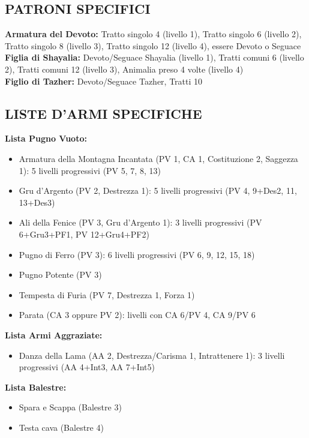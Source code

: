 \begin{multicols}{2}
	\subsection{PATRONI SPECIFICI}

	\textbf{Armatura del Devoto:} Tratto singolo 4 (livello 1), Tratto singolo 6 (livello 2), Tratto singolo 8 (livello 3), Tratto singolo 12 (livello 4), essere Devoto o Seguace\\

	\textbf{Figlia di Shayalia:} Devoto/Seguace Shayalia (livello 1), Tratti comuni 6 (livello 2), Tratti comuni 12 (livello 3), Animalia preso 4 volte (livello 4)\\

	\textbf{Figlio di Tazher:} Devoto/Seguace Tazher, Tratti 10\\

	\subsection{LISTE D'ARMI SPECIFICHE}

	\textbf{Lista Pugno Vuoto:}
	\begin{itemize}
		\item Armatura della Montagna Incantata (PV 1, CA 1, Costituzione 2, Saggezza 1): 5 livelli progressivi (PV 5, 7, 8, 13)
		\item Gru d'Argento (PV 2, Destrezza 1): 5 livelli progressivi (PV 4, 9+Des2, 11, 13+Des3)
		\item Ali della Fenice (PV 3, Gru d'Argento 1): 3 livelli progressivi (PV 6+Gru3+PF1, PV 12+Gru4+PF2)
		\item Pugno di Ferro (PV 3): 6 livelli progressivi (PV 6, 9, 12, 15, 18)
		\item Pugno Potente (PV 3)
		\item Tempesta di Furia (PV 7, Destrezza 1, Forza 1)
		\item Parata (CA 3 oppure PV 2): livelli con CA 6/PV 4, CA 9/PV 6
	\end{itemize}

	\textbf{Lista Armi Aggraziate:}
	\begin{itemize}
		\item Danza della Lama (AA 2, Destrezza/Carisma 1, Intrattenere 1): 3 livelli progressivi (AA 4+Int3, AA 7+Int5)
	\end{itemize}

	\textbf{Lista Balestre:}
	\begin{itemize}
		\item Spara e Scappa (Balestre 3)
		\item Testa cava (Balestre 4)
	\end{itemize}


\end{multicols}
